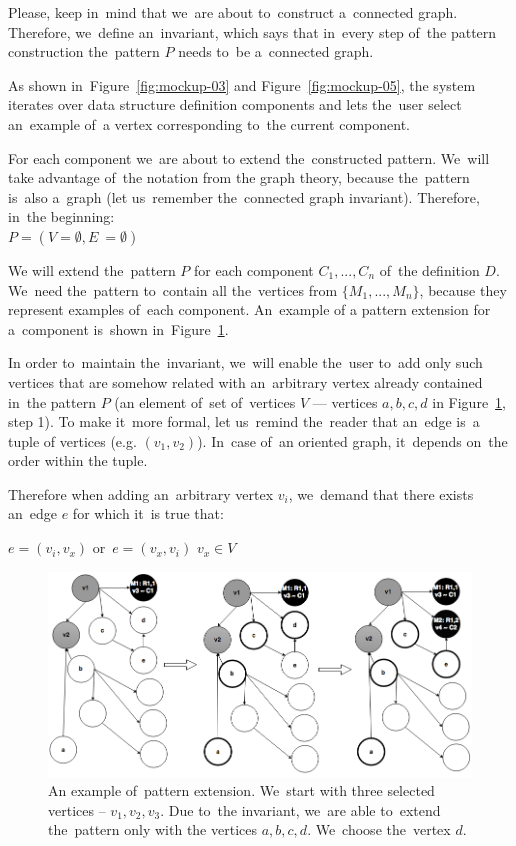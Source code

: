 Please, keep in~mind that we~are about to~construct a~connected graph. Therefore, we~define an~invariant, which says that in~every 
step of~the pattern construction the~pattern $P$ needs to~be a~connected graph.

As shown in~Figure~\ref{fig:mockup-03} and Figure~\ref{fig:mockup-05},
the system iterates over data 
structure definition components and lets the~user select an~example of~a 
vertex corresponding to~the current component.

For each component we~are about 
to extend the~constructed pattern. We~will take advantage of~the notation from the
graph theory, because the~pattern is~also a~graph (let us~remember the~connected graph invariant).
Therefore, in~the beginning:\\

{\centering $P = (V = \emptyset, E~= \emptyset)$ \\[0.5cm]}

We will extend the~pattern $P$ for each component $C_1, ..., C_n$ of~the 
definition $D$. We~need the~pattern to~contain all the~vertices from $\{M_1 ,..., 
M_n\}$, because they represent examples of~each component. An~example of
a pattern extension for a~component is~shown in~Figure~\ref{fig:pattern-enhancement}.

In order to~maintain the~invariant, we~will enable the~user to~add only such 
vertices that are somehow related with an~arbitrary vertex already contained in~the pattern $P$ (an element of~set of~vertices $V$ --- vertices $a,b,c,d$
in Figure~\ref{fig:pattern-enhancement}, step 1).
To make it~more formal, let us~remind the~reader that an~edge is~a tuple 
of vertices (e.g. $(v_1,v_2)$). In~case of~an oriented graph, it~depends on~the order within 
the tuple.

Therefore when adding an~arbitrary vertex $v_i$, we~demand that there exists an~edge $e$ for which it~is true that:

\begin{center}
{$e = (v_i,v_x)$ or~$e = (v_x, v_i)$ \land $v_x \in V$ \\[0.5cm]}
\end{center}

\begin{figure}
	\centering
	\includegraphics[width=140mm]{img/pattern-enhancement.png}
	\caption{An example of~pattern extension. We~start with three selected vertices
	-- $v_1, v_2, v_3$. Due to~the invariant, we~are able to~extend the~pattern only with
	the vertices $a,b,c,d$. We~choose the~vertex $d$.}
	\label{fig:pattern-enhancement}
\end{figure}

